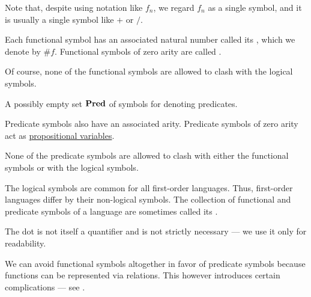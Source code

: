 \begin{definition}
\begin{description}
\begin{thmenum}[resume=def:first_order_language]
      Note that, despite using notation like \( f_n \), we regard \( f_n \) as a single symbol, and it is usually a single symbol like \( + \) or \( / \).

      Each functional symbol has an associated natural number called its , which we denote by \( \# f \). Functional symbols of zero arity are called .

      Of course, none of the functional symbols are allowed to clash with the logical symbols.

       A possibly empty  set \( \op*{Pred} \) of symbols for denoting predicates.

      Predicate symbols also have an associated arity. Predicate symbols of zero arity act as \hyperref[def:propositional_syntax/prop]{propositional variables}.

      None of the predicate symbols are allowed to clash with either the functional symbols or with the logical symbols.
    \end{thmenum}
  \end{description}

  The logical symbols are common for all first-order languages. Thus, first-order languages differ by their non-logical symbols. The collection of functional and predicate symbols of a language are sometimes called its .
\end{definition}
\begin{comments}
  \item The dot is not itself a quantifier and is not strictly necessary --- we use it only for readability.

  \item We can avoid functional symbols altogether in favor of predicate symbols because functions can be represented via relations. This however introduces certain complications --- see .
\end{comments}

